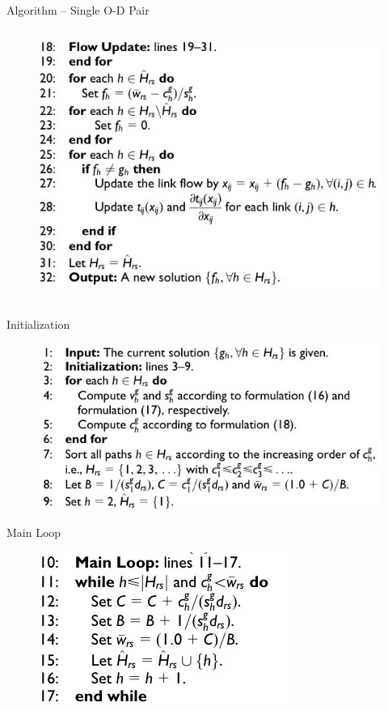 \documentclass{beamer}
\begin{document}
\begin{frame}{Algorithm -- Single O-D Pair}
\begin{columns}
    \begin{column}{0.4\textwidth}
    \begin{figure}
    \includegraphics[width=\textwidth]{./alg13.jpg}
    \end{figure}
    \end{column}
\end{columns}
\end{frame}


\begin{frame}{Initialization}
    \begin{figure}
    \includegraphics[width=\textwidth]{./alg11.jpg}
    \end{figure}
\end{frame}


\begin{frame}{Main Loop}
    \begin{figure}
    \includegraphics[scale=0.5]{./alg12.jpg}
    \end{figure}
\end{frame}
\end{document}
